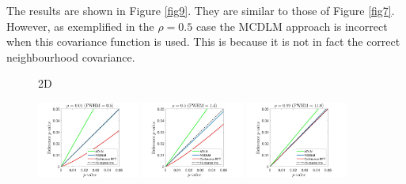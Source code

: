 \documentclass{article}
\begin{document}
The results are shown in Figure \ref{fig9}. They are similar to those of Figure \ref{fig7}. However, as exemplified in the $\rho = 0.5$ case the MCDLM approach is incorrect when this covariance function is used. This is because it is not in fact the correct neighbourhood covariance. 
\begin{figure}[!htp]
\centering
\begin{sideways}
\phantom{------------------}2D
\end{sideways}
\includegraphics[trim=80 5 80 5, clip,width=0.3\textwidth]{figure/2D_rho0.01.jpg}
\includegraphics[trim=80 5 80 5, clip,width=0.3\textwidth]{figure/2D_rho0.5.jpg}
\includegraphics[trim=80 5 80 5, clip,width=0.3\textwidth]{figure/2D_rho0.99.jpg}


\end{figure}
\end{document}
